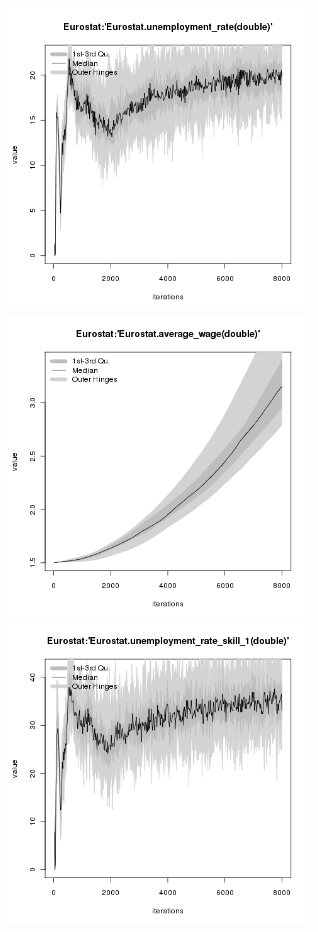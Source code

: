 \begin{figure}[H!]
\centering\leavevmode
\begin{minipage}{17cm}
\centering\leavevmode
\includegraphics[width=8cm]{./benchmark_plots/Eurostat-unemployment_rate.png}
\includegraphics[width=8cm]{./benchmark_plots/Eurostat-average_wage.png}\\
\includegraphics[width=8cm]{./benchmark_plots/Eurostat-unemployment_rate_skill_1.png}

\end{minipage}
\end{figure}
